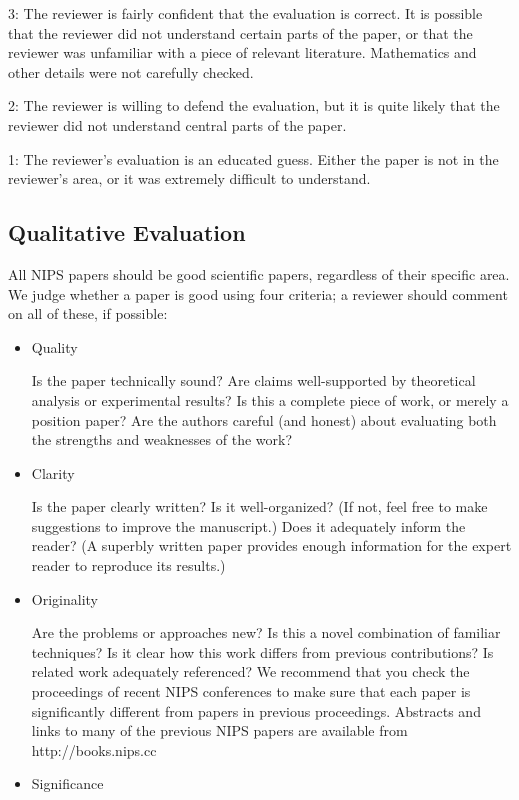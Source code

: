 3: The reviewer is fairly confident that the evaluation is correct. It
is possible that the reviewer did not understand certain parts of the
paper, or that the reviewer was unfamiliar with a piece of relevant
literature. Mathematics and other details were not carefully checked.

2: The reviewer is willing to defend the evaluation, but it is quite
likely that the reviewer did not understand central parts of the paper.

1: The reviewer's evaluation is an educated guess. Either the paper is
not in the reviewer's area, or it was extremely difficult to understand.

\hypertarget{qualitative-evaluation}{%
\subsection{Qualitative Evaluation}\label{qualitative-evaluation}}

All NIPS papers should be good scientific papers, regardless of their
specific area. We judge whether a paper is good using four criteria; a
reviewer should comment on all of these, if possible:

\begin{itemize}
\item
  Quality

  Is the paper technically sound? Are claims well-supported by
  theoretical analysis or experimental results? Is this a complete piece
  of work, or merely a position paper? Are the authors careful (and
  honest) about evaluating both the strengths and weaknesses of the
  work?
\item
  Clarity

  Is the paper clearly written? Is it well-organized? (If not, feel free
  to make suggestions to improve the manuscript.) Does it adequately
  inform the reader? (A superbly written paper provides enough
  information for the expert reader to reproduce its results.)
\item
  Originality

  Are the problems or approaches new? Is this a novel combination of
  familiar techniques? Is it clear how this work differs from previous
  contributions? Is related work adequately referenced? We recommend
  that you check the proceedings of recent NIPS conferences to make sure
  that each paper is significantly different from papers in previous
  proceedings. Abstracts and links to many of the previous NIPS papers
  are available from http://books.nips.cc
\item
  Significance
\end{itemize}

